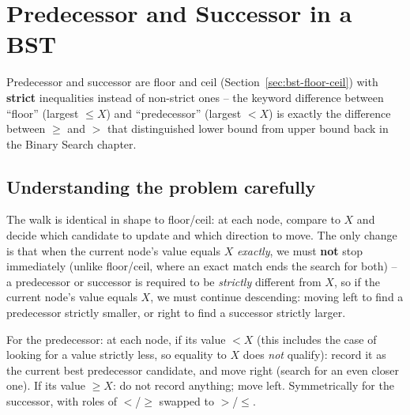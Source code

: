 \section{Predecessor and Successor in a BST}
\label{sec:bst-pred-succ}


\begin{patternbox}
Predecessor and successor are floor and ceil
(Section~\ref{sec:bst-floor-ceil}) with \textbf{strict} inequalities
instead of non-strict ones -- the keyword difference between ``floor''
(largest $\le X$) and ``predecessor'' (largest $<X$) is exactly the
difference between $\ge$ and $>$ that distinguished lower bound from
upper bound back in the Binary Search chapter.
\end{patternbox}

\subsection*{Understanding the problem carefully}

The walk is identical in shape to floor/ceil: at each node, compare to
$X$ and decide which candidate to update and which direction to move.
The only change is that when the current node's value equals $X$
\emph{exactly}, we must \textbf{not} stop immediately (unlike floor/ceil,
where an exact match ends the search for both) -- a predecessor or
successor is required to be \emph{strictly} different from $X$, so if the
current node's value equals $X$, we must continue descending: moving left
to find a predecessor strictly smaller, or right to find a successor
strictly larger.

\begin{ideabox}
For the predecessor: at each node, if its value $<X$ (this includes the
case of looking for a value strictly less, so equality to $X$ does
\emph{not} qualify): record it as the current best predecessor candidate,
and move right (search for an even closer one). If its value $\ge X$: do
not record anything; move left. Symmetrically for the successor, with
roles of $<$/$\ge$ swapped to $>$/$\le$.
\end{ideabox}

